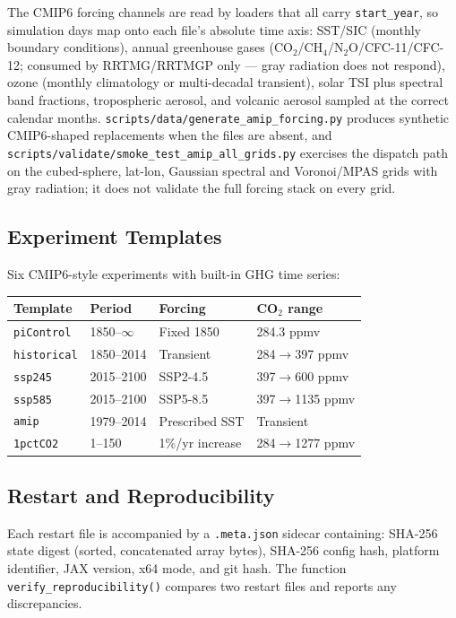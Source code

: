 \documentclass[11pt,a4paper]{article}
\begin{document}
The CMIP6 forcing channels are read by loaders that all carry \texttt{start\_year}, so simulation days map onto each file's absolute time axis: SST/SIC (monthly boundary conditions), annual greenhouse gases (CO$_2$/CH$_4$/N$_2$O/CFC-11/CFC-12; consumed by RRTMG/RRTMGP only --- gray radiation does not respond), ozone (monthly climatology or multi-decadal transient), solar TSI plus spectral band fractions, tropospheric aerosol, and volcanic aerosol sampled at the correct calendar months.  \texttt{scripts/data/generate\_amip\_forcing.py} produces synthetic CMIP6-shaped replacements when the files are absent, and \texttt{scripts/validate/smoke\_test\_amip\_all\_grids.py} exercises the dispatch path on the cubed-sphere, lat-lon, Gaussian spectral and Voronoi/MPAS grids with gray radiation; it does not validate the full forcing stack on every grid.

\subsection{Experiment Templates}

Six CMIP6-style experiments with built-in GHG time series:

\begin{center}
\begin{tabular}{llll}
\toprule
Template & Period & Forcing & CO$_2$ range \\
\midrule
\texttt{piControl} & 1850--$\infty$ & Fixed 1850 & 284.3 ppmv \\
\texttt{historical} & 1850--2014 & Transient & 284$\to$397 ppmv \\
\texttt{ssp245} & 2015--2100 & SSP2-4.5 & 397$\to$600 ppmv \\
\texttt{ssp585} & 2015--2100 & SSP5-8.5 & 397$\to$1135 ppmv \\
\texttt{amip} & 1979--2014 & Prescribed SST & Transient \\
\texttt{1pctCO2} & 1--150 & 1\%/yr increase & 284$\to$1277 ppmv \\
\bottomrule
\end{tabular}
\end{center}

\subsection{Restart and Reproducibility}

Each restart file is accompanied by a \texttt{.meta.json} sidecar containing:
SHA-256 state digest (sorted, concatenated array bytes), SHA-256 config hash,
platform identifier, JAX version, x64 mode, and git hash.
The function \texttt{verify\_reproducibility()} compares two restart files and reports any discrepancies.
\end{document}
